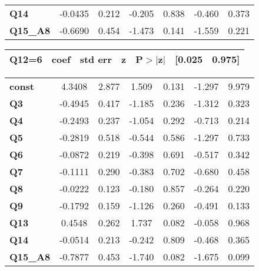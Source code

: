 \begin{center}
\begin{tabular}{lcccccc}
\textbf{Q14}     &      -0.0435  &        0.212     &    -0.205  &         0.838        &       -0.460    &        0.373     \\
\textbf{Q15\_A8} &      -0.6690  &        0.454     &    -1.473  &         0.141        &       -1.559    &        0.221     \\
\bottomrule
\end{tabular}
\newpage
\begin{tabular}{ccccccc}
 \textbf{Q12=6}  & \textbf{coef} & \textbf{std err} & \textbf{z} & \textbf{P$> |$z$|$} & \textbf{[0.025} & \textbf{0.975]}  \\
\midrule
\bottomrule
\end{tabular}
\begin{tabular}{lcccccc}
\textbf{const}   &       4.3408  &        2.877     &     1.509  &         0.131        &       -1.297    &        9.979     \\
\textbf{Q3}      &      -0.4945  &        0.417     &    -1.185  &         0.236        &       -1.312    &        0.323     \\
\textbf{Q4}      &      -0.2493  &        0.237     &    -1.054  &         0.292        &       -0.713    &        0.214     \\
\textbf{Q5}      &      -0.2819  &        0.518     &    -0.544  &         0.586        &       -1.297    &        0.733     \\
\textbf{Q6}      &      -0.0872  &        0.219     &    -0.398  &         0.691        &       -0.517    &        0.342     \\
\textbf{Q7}      &      -0.1111  &        0.290     &    -0.383  &         0.702        &       -0.680    &        0.458     \\
\textbf{Q8}      &      -0.0222  &        0.123     &    -0.180  &         0.857        &       -0.264    &        0.220     \\
\textbf{Q9}      &      -0.1792  &        0.159     &    -1.126  &         0.260        &       -0.491    &        0.133     \\
\textbf{Q13}     &       0.4548  &        0.262     &     1.737  &         0.082        &       -0.058    &        0.968     \\
\textbf{Q14}     &      -0.0514  &        0.213     &    -0.242  &         0.809        &       -0.468    &        0.365     \\
\textbf{Q15\_A8} &      -0.7877  &        0.453     &    -1.740  &         0.082        &       -1.675    &        0.099     \\

\end{tabular}
\end{center}

